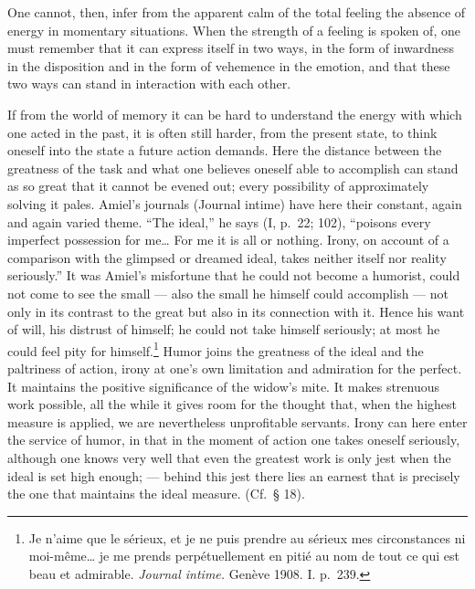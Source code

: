\documentclass[12pt]{book}
\newcommand{\opage}[1]{\marginnote{\footnotesize\textit{[#1]}}}
\begin{document}
One cannot, then, infer from the apparent calm of the total feeling the absence of energy in
momentary situations. When the strength of a feeling is spoken of, one must remember that it
can express itself in two ways, in the form of inwardness in the disposition and in the form
of vehemence in the emotion, and that these two ways can stand in interaction with each
other.

If from the world of memory it can be hard to understand the energy with which one acted in
the past, it is often still harder, from the present state, to think oneself into the state
a future action demands. Here the distance between the greatness of the task and what one
believes oneself able to accomplish can stand as so great that it cannot be evened out; every
possibility of approximately solving it pales. Amiel's journals (Journal intime) have here
their constant, again and again varied theme. %
``The ideal,'' he says (I, p.~22; 102), ``poisons every imperfect possession for me\dots{} For
me it is all or nothing. Irony, on account of a comparison with the glimpsed or dreamed ideal,
takes neither itself nor reality seriously.'' It was Amiel's misfortune that he could not
become a humorist, could not come to see the small --- also the small he himself could
accomplish --- not only in its contrast to the great but also in its connection with it.
Hence his want of will, his distrust of himself; he could not take himself seriously; at most
he could feel pity for himself.\footnote{Je n'aime que le sérieux, et je ne puis prendre au
sérieux mes circonstances ni moi-même\dots{} je me prends perpétuellement en pitié au nom de
tout ce qui est beau et admirable. \textit{Journal intime.} Genève 1908. I. p.~239.} %
\opage{132}Humor joins the greatness of the ideal and the paltriness of action, irony at one's
own limitation and admiration for the perfect. It maintains the positive significance of the
widow's mite. It makes strenuous work possible, all the while it gives room for the thought
that, when the highest measure is applied, we are nevertheless unprofitable servants. Irony
can here enter the service of humor, in that in the moment of action one takes oneself
seriously, although one knows very well that even the greatest work is only jest when the
ideal is set high enough; --- behind this jest there lies an earnest that is precisely the one
that maintains the ideal measure. (Cf.\ § 18).
\end{document}
